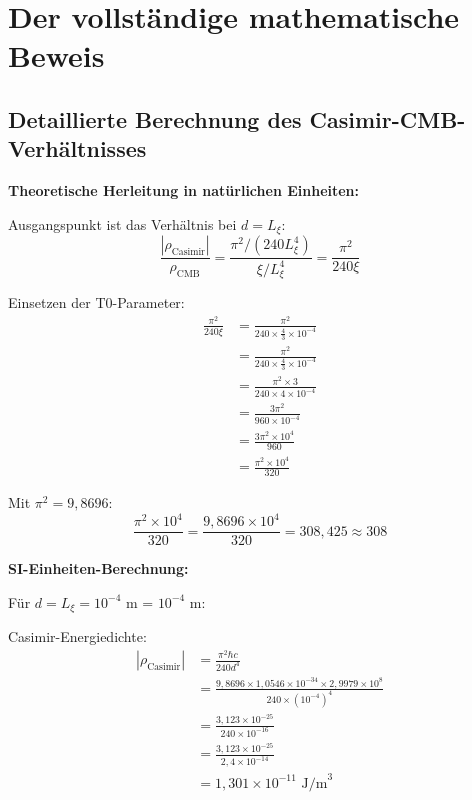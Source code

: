 \documentclass[12pt,a4paper]{article}
\begin{document}
	
	\section{Der vollst\"andige mathematische Beweis}
	

	\subsection{Detaillierte Berechnung des Casimir-CMB-Verh\"altnisses}
		
		\textbf{Theoretische Herleitung in nat\"urlichen Einheiten:}
		
		Ausgangspunkt ist das Verh\"altnis bei $d = L_\xi$:
		\begin{equation}
			\frac{|\rho_{\text{Casimir}}|}{\rho_{\text{CMB}}} = \frac{\pi^2/(240 L_\xi^4)}{\xi/L_\xi^4} = \frac{\pi^2}{240 \xi}
		\end{equation}
		
		Einsetzen der T0-Parameter:
		\begin{align}
			\frac{\pi^2}{240 \xi} &= \frac{\pi^2}{240 \times \frac{4}{3} \times 10^{-4}} \\
			&= \frac{\pi^2}{240 \times \frac{4}{3} \times 10^{-4}} \\
			&= \frac{\pi^2 \times 3}{240 \times 4 \times 10^{-4}} \\
			&= \frac{3\pi^2}{960 \times 10^{-4}} \\
			&= \frac{3\pi^2 \times 10^4}{960} \\
			&= \frac{\pi^2 \times 10^4}{320}
		\end{align}
		
		Mit $\pi^2 = 9{,}8696$:
		\begin{equation}
			\frac{\pi^2 \times 10^4}{320} = \frac{9{,}8696 \times 10^4}{320} = 308{,}425 \approx 308
		\end{equation}
		
		\textbf{SI-Einheiten-Berechnung:}
		
		F\"ur $d = L_\xi = 10^{-4}$ m = $10^{-4}$ m:
		
		Casimir-Energiedichte:
		\begin{align}
			|\rho_{\text{Casimir}}| &= \frac{\pi^2 \hbar c}{240 d^4} \\
			&= \frac{9{,}8696 \times 1{,}0546 \times 10^{-34} \times 2{,}9979 \times 10^8}{240 \times (10^{-4})^4} \\
			&= \frac{3{,}123 \times 10^{-25}}{240 \times 10^{-16}} \\
			&= \frac{3{,}123 \times 10^{-25}}{2{,}4 \times 10^{-14}} \\
			&= 1{,}301 \times 10^{-11} \text{ J/m}^3
		\end{align}
		
\end{document}
